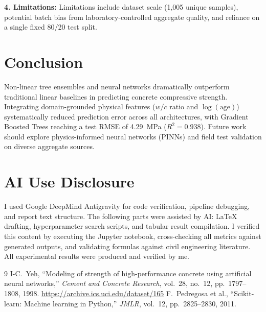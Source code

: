 \documentclass[conference,10pt,a4paper]{IEEEtran}
\begin{document}
\textbf{4. Limitations:} Limitations include dataset scale (1,005 unique samples), potential batch bias from laboratory-controlled aggregate quality, and reliance on a single fixed 80/20 test split.

\section{Conclusion}
Non-linear tree ensembles and neural networks dramatically outperform traditional linear baselines in predicting concrete compressive strength. Integrating domain-grounded physical features ($w/c$ ratio and $\log(\text{age})$) systematically reduced prediction error across all architectures, with Gradient Boosted Trees reaching a test RMSE of 4.29~MPa ($R^2 = 0.938$). Future work should explore physics-informed neural networks (PINNs) and field test validation on diverse aggregate sources.

\section*{AI Use Disclosure}
I used Google DeepMind Antigravity for code verification, pipeline debugging, and report text structure. The following parts were assisted by AI: LaTeX drafting, hyperparameter search scripts, and tabular result compilation. I verified this content by executing the Jupyter notebook, cross-checking all metrics against generated outputs, and validating formulas against civil engineering literature. All experimental results were produced and verified by me.

\begin{thebibliography}{9}
 I-C.\ Yeh, ``Modeling of strength of high-performance concrete using artificial neural networks,'' \emph{Cement and Concrete Research}, vol.\ 28, no.\ 12, pp.\ 1797--1808, 1998. \url{https://archive.ics.uci.edu/dataset/165}
 F.\ Pedregosa et al., ``Scikit-learn: Machine learning in Python,'' \emph{JMLR}, vol.\ 12, pp.\ 2825--2830, 2011.
\end{thebibliography}
\end{document}

